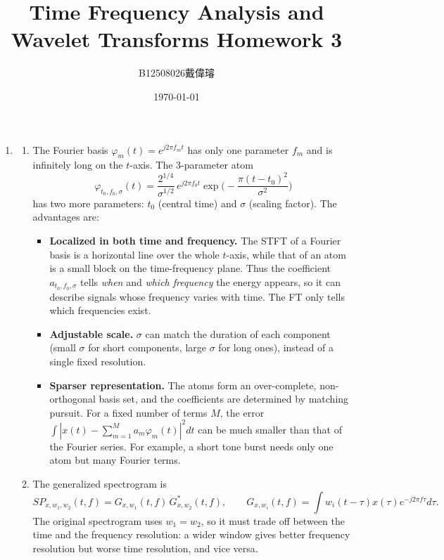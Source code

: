 \documentclass[12pt,a4paper]{article}
\title{Time Frequency Analysis and Wavelet Transforms Homework 3}
\author{B12508026戴偉璿}
\date{\today}
\begin{document}
\maketitle


\begin{enumerate}

\item
\begin{enumerate}[label=(\alph*)]
  \item The Fourier basis $\varphi_m(t)=e^{j2\pi f_mt}$ has only one parameter $f_m$ and is infinitely long on the $t$-axis. The 3-parameter atom
  \[
  \varphi_{t_0,f_0,\sigma}(t)=\frac{2^{1/4}}{\sigma^{1/2}}\,e^{j2\pi f_0t}\exp\!\Big(-\frac{\pi(t-t_0)^2}{\sigma^2}\Big)
  \]
  has two more parameters: $t_0$ (central time) and $\sigma$ (scaling factor). The advantages are:
  \begin{itemize}
    \item \textbf{Localized in both time and frequency.} The STFT of a Fourier basis is a horizontal line over the whole $t$-axis, while that of an atom is a small block on the time-frequency plane. Thus the coefficient $a_{t_0,f_0,\sigma}$ tells \emph{when} and \emph{which frequency} the energy appears, so it can describe signals whose frequency varies with time. The FT only tells which frequencies exist.
    \item \textbf{Adjustable scale.} $\sigma$ can match the duration of each component (small $\sigma$ for short components, large $\sigma$ for long ones), instead of a single fixed resolution.
    \item \textbf{Sparser representation.} The atoms form an over-complete, non-orthogonal basis set, and the coefficients are determined by matching pursuit. For a fixed number of terms $M$, the error $\int|x(t)-\sum_{m=1}^{M}a_m\varphi_m(t)|^2dt$ can be much smaller than that of the Fourier series. For example, a short tone burst needs only one atom but many Fourier terms.
  \end{itemize}

  \item The generalized spectrogram is
  \[
  SP_{x,w_1,w_2}(t,f)=G_{x,w_1}(t,f)\,G^*_{x,w_2}(t,f),\qquad
  G_{x,w_i}(t,f)=\int w_i(t-\tau)x(\tau)e^{-j2\pi f\tau}d\tau .
  \]
  The original spectrogram uses $w_1=w_2$, so it must trade off between the time and the frequency resolution: a wider window gives better frequency resolution but worse time resolution, and vice versa.


\end{enumerate}
\end{enumerate}
\end{document}
